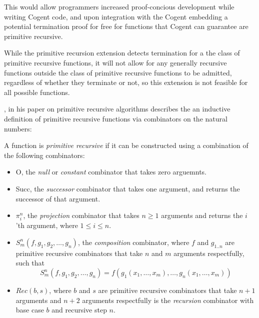 This would allow programmers increased proof-concious development while writing Cogent code,
and upon integration with the Cogent embedding a potential termination proof for free for
functions that Cogent can guarantee are primitive recursive.

While the primitive recursion extension detects termination for a the class of primitive recursive functions,
it will not allow for any generally recursive functions outside the class of primitive recursive functions to
be admitted, regardless of whether they terminate or not, so this extension is not feasible for all possible functions.

\citet{AboutPrimrecAlgorithms}, in his paper on primitive recursive algorithms describes the
an inductive definition of primitive recursive functions via combinators on the natural numbers:

\theoremstyle{definition}
\begin{definition}
    \label{def:primrec}
    A function is \textit{primitive recursive} if it can be constructed using 
    a combination of the following combinators:

    \begin{itemize}
        \item 
            \textsf{O}, the \textit{null} or \textit{constant} combinator that takes zero arguemnts.
        \item 
            \textsf{Succ}, the \textit{successor} combinator that takes one argument, and returns the successor
            of that argument.
        \item 
            \textsf{$\pi^n_i$}, the \textit{projection} combinator that takes $n \geq 1$ arguments and returns
            the $i$'th argument, where $1 \leq i \leq n$.
        \item 
            \textsf{$S^n_m(f, g_1, g_2, \dots, g_n)$}, the \textit{composition} combinator, where $f$ and $g_{1..n}$ are 
            primitive recursive combinators that take $n$ and $m$ arguments respectfully, such that 
                $$S^n_m(f, g_1, g_2, \dots, g_n) = f(g_1(x_1, \dots, x_m), \dots, g_n(x_1, \dots, x_m))$$
        \item 
            \textsf{$Rec(b,s)$}, where $b$ and $s$ are primitive recursive combinators that take
            $n + 1$ arguments and $n + 2$ arguments respectfully is the \textit{recursion}
            combinator with base case $b$ and recursive step $n$.
    \end{itemize}
\end{definition}

